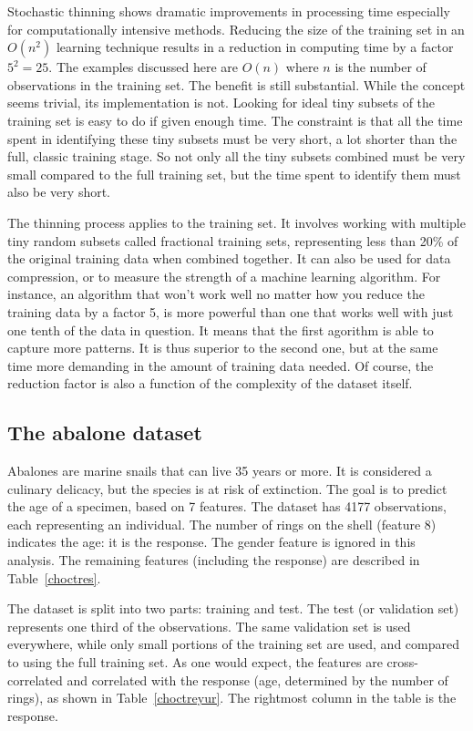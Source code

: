 \documentclass[oneside,10pt]{book}
\begin{document}
Stochastic thinning shows dramatic improvements in processing time especially for computationally intensive methods.  Reducing the size 
 of the training set in an $O(n^2)$ learning technique results in a reduction in computing time by a factor $5^2 = 25$. The examples discussed here are $O(n)$ where $n$ is the number of observations in the training set. The benefit is still substantial.  While the concept seems trivial, its implementation is not. Looking for ideal tiny subsets of the training set is easy to do if given enough time. The constraint is that all the time spent in identifying these tiny subsets must be very short, a lot shorter than the full, classic training stage. So not only all the
 tiny subsets combined must be very small compared to the full training set, but the time spent to identify them must also be very short.

The thinning process applies to the training set.  It involves working with multiple
 tiny random subsets called \textcolor{index}{fractional training sets}, representing less than 20\% of the original training data when combined together. It can also be used
 for data compression, or to measure the strength of a machine learning algorithm. For instance, an algorithm that won't work well 
 no matter how  you reduce the training data by a factor 5, is more powerful than one that works well with just one tenth of the data in question. It means that the first agorithm is able to capture more patterns. It is thus superior to the second one, but at the same time more demanding in the amount of training data needed. Of course, the reduction factor is also a function of the complexity of the dataset itself. 

\subsection{The abalone dataset}\label{treszx}

Abalones are marine snails that can live 35 years or more. It is considered a culinary delicacy, but the species is at risk of extinction. 
 The goal is to predict the age of a specimen, based on 7 features. The dataset has 4177 observations, each representing an
 individual. The number of rings on the shell (feature 8) indicates the age: it is the response. The gender feature is ignored in this analysis. The remaining features (including the response) are described in Table~\ref{choctres}.



\noindent The dataset is split into two parts: training and test. The test (or validation set) represents one third of the observations. The same validation set is used everywhere, while only small portions of the training set are used, and compared to using the full training set. 
As one would expect, the features are cross-correlated and correlated with the response (age, determined by the number of rings), as shown in Table~\ref{choctreyur}. The rightmost column in the table is the response.
\end{document}
